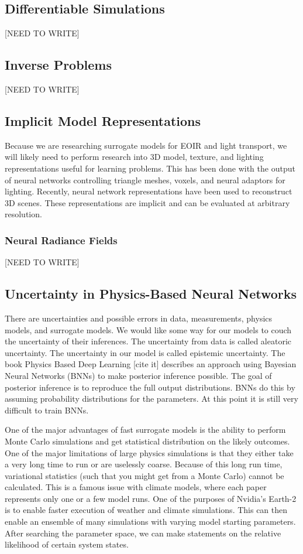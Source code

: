 \documentclass[]{article}
\begin{document}
\subsection{Differentiable Simulations}
[NEED TO WRITE]
\subsection{Inverse Problems}
[NEED TO WRITE]
\subsection{Implicit Model Representations}
Because we are researching surrogate models for EOIR and light transport, we will likely need to perform research into 3D model, texture, and lighting representations useful for learning problems.  This has been done with the output of neural networks controlling triangle meshes, voxels, and neural adaptors for lighting.  Recently, neural network representations have been used to reconstruct 3D scenes.  These representations are implicit and can be evaluated at arbitrary resolution.
\subsubsection{Neural Radiance Fields}
[NEED TO WRITE]
\subsection{Uncertainty in Physics-Based Neural Networks}
There are uncertainties and possible errors in data, measurements, physics models, and surrogate models.  We would like some way for our models to couch the uncertainty of their inferences.  The uncertainty from data is called aleatoric uncertainty.  The uncertainty in our model is called epistemic uncertainty.  The book Physics Based Deep Learning [cite it] describes an approach using Bayesian Neural Networks (BNNs) to make posterior inference possible.  The goal of posterior inference is to reproduce the full output distributions.  BNNs do this by assuming probability distributions for the parameters.  At this point it is still very difficult to train BNNs.

One of the major advantages of fast surrogate models is the ability to perform Monte Carlo simulations and get statistical distribution on the likely outcomes.  One of the major limitations of large physics simulations is that they either take a very long time to run or are uselessly coarse.  Because of this long run time, variational statistics (such that you might get from a Monte Carlo) cannot be calculated.  This is a famous issue with climate models, where each paper represents only one or a few model runs.  One of the purposes of Nvidia’s Earth-2 is to enable faster execution of weather and climate simulations.  This can then enable an ensemble of many simulations with varying model starting parameters.  After searching the parameter space, we can make statements on the relative likelihood of certain system states. 
\end{document}
